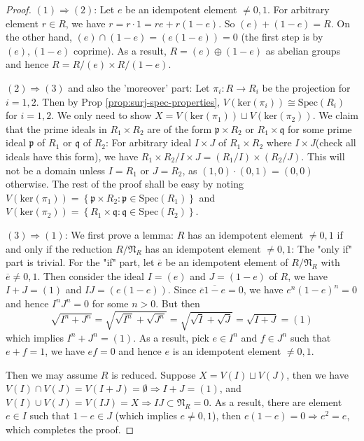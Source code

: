 \documentclass{note-eng}
\begin{document}
\begin{proof}
    $(1) \Rightarrow (2)$: Let $e$ be an idempotent element $\ne 0, 1$. For arbitrary element $r \in R$, we have $r = r \cdot 1 = re + r(1 - e)$. So $(e) + (1 - e) = R$. On the other hand, $(e) \cap (1 - e) = (e(1 - e)) = 0$ (the first step is by $(e), (1 - e)$ coprime). As a result, $R = (e) \oplus (1 - e)$ as abelian groups and hence $R = R / (e) \times R / (1 - e)$.

    $(2) \Rightarrow (3)$ and also the 'moreover' part: Let $\pi_i: R \rightarrow R_i$ be the projection for $i = 1, 2$. Then by Prop \ref{prop:surj-spec-properties}, $V(\mathrm{ker}(\pi_i)) \cong \mathrm{Spec}(R_i)$ for $i = 1, 2$. We only need to show $X = V(\mathrm{ker}(\pi_1)) \sqcup V(\mathrm{ker}(\pi_2))$. We claim that the prime ideals in $R_1 \times R_2$ are of the form $\mathfrak{p} \times R_2$ or $R_1 \times \mathfrak{q}$ for some prime ideal $\mathfrak{p}$ of $R_1$ or $\mathfrak{q}$ of $R_2$: For arbitrary ideal $I \times J$ of $R_1 \times R_2$ where $I \times J$(check all ideals have this form), we have $R_1 \times R_2 / I \times J = (R_1 / I) \times (R_2 / J)$. This will not be a domain unless $I = R_1$ or $J = R_2$, as $(1, 0) \cdot (0, 1) = (0, 0)$ otherwise. The rest of the proof shall be easy by noting $V(\mathrm{ker}(\pi_1)) = \left\lbrace \mathfrak{p} \times R_2: \mathfrak{p} \in \mathrm{Spec}(R_1) \right\rbrace$ and $V(\mathrm{ker}(\pi_2)) = \left\lbrace R_1 \times \mathfrak{q}: \mathfrak{q} \in \mathrm{Spec}(R_2) \right\rbrace$.

    $(3) \Rightarrow (1)$: We first prove a lemma: $R$ has an idempotent element $\ne 0, 1$ if and only if the reduction $R / \mathfrak{N}_R$ has an idempotent element $\ne 0, 1$: The "only if" part is trivial. For the "if" part, let $\overline{e}$ be an idempotent element of $R / \mathfrak{N}_R$ with $\overline{e} \ne 0, 1$. Then consider the ideal $I = (e)$ and $J = (1 - e)$ of $R$, we have $I + J = (1)$ and $IJ = (e(1 - e))$. Since $\overline{e}\overline{1 - e} = 0$, we have $e^n(1 - e)^n = 0$ and hence $I^nJ^n = 0$ for some $n \gt 0$. But then
    $$\sqrt{I^n + J^n} = \sqrt{\sqrt{I^n} + \sqrt{J^n}} = \sqrt{\sqrt{I} + \sqrt{J}} = \sqrt{I + J} = (1)$$
    which implies $I^n + J^n = (1)$. \iffalse (\TODO add reference for this part) \fi As a result, pick $e \in I^n$ and $f \in J^n$ such that $e + f = 1$, we have $ef = 0$ and hence $e$ is an idempotent element $\ne 0, 1$.
    
    Then we may assume $R$ is reduced. Suppose $X = V(I) \sqcup V(J)$, then we have $V(I) \cap V(J) = V(I + J) = \emptyset \Rightarrow I + J = (1)$, and $V(I) \cup V(J) = V(I J) = X \Rightarrow IJ \subset \mathfrak{N}_R = 0$. As a result, there are element $e \in I$ such that $1 - e \in J$ (which implies $e \ne 0, 1$), then $e(1 - e) = 0 \Rightarrow e^2 = e$, which completes the proof.
\end{proof}
\end{document}
